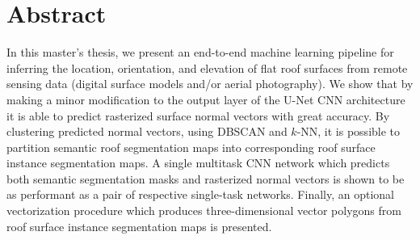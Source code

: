 \chapter*{Abstract}

In this master's thesis, we present an end-to-end machine learning pipeline for inferring the location, orientation, and elevation of flat roof surfaces from remote sensing data (digital surface models and/or aerial photography).
We show that by making a minor modification to the output layer of the U-Net CNN architecture it is able to predict rasterized surface normal vectors with great accuracy.
By clustering predicted normal vectors, using DBSCAN and $k$-NN, it is possible to partition semantic roof segmentation maps into corresponding roof surface instance segmentation maps.
A single multitask CNN network which predicts both semantic segmentation masks and rasterized normal vectors is shown to be as performant as a pair of respective single-task networks.
Finally, an optional vectorization procedure which produces three-dimensional vector polygons from roof surface instance segmentation maps is presented.
